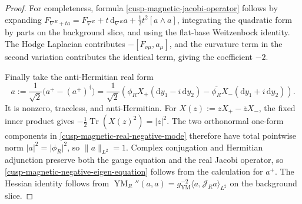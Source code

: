 \begin{proof}
For completeness, formula \eqref{cusp-magnetic-jacobi-operator} follows by
expanding
\(F_{\nabla^R+ta}=F_{\nabla^R}+t\,\mathrm d_{\nabla^R}a+
\tfrac12t^2[a\wedge a]\), integrating the quadratic form by parts on
the background slice, and using the flat-base Weitzenbock identity.  The
Hodge Laplacian contributes
\(-[F_{\nu\mu},a_\mu]\), and the curvature term in the second variation
contributes the identical term, giving the coefficient \(-2\).

Finally take the anti-Hermitian real form
\begin{equation}
 a:=\frac1{\sqrt2}\bigl(a^+-(a^+)^\dagger\bigr)
  =\frac1{\sqrt2}\left(
   \phi_RX_+(\mathrm dy_1-i\,\mathrm dy_2)
   -\overline{\phi_R}X_-(\mathrm dy_1+i\,\mathrm dy_2)\right).
 \label{cusp-magnetic-real-negative-mode}
\end{equation}
It is nonzero, traceless, and anti-Hermitian.  For
\(X(z):=zX_+-\overline zX_-\), the fixed inner product gives
\(-\tfrac12\operatorname{Tr}(X(z)^2)=\lvert z\rvert^2\).  The two
orthonormal one-form components in
\cref{cusp-magnetic-real-negative-mode} therefore have total pointwise
norm \(\lvert a\rvert^2=\lvert\phi_R\rvert^2\), so
\(\lVert a\rVert_{L^2}=1\).  Complex conjugation and
Hermitian adjunction preserve both the gauge equation and the real Jacobi
operator, so \eqref{cusp-magnetic-negative-eigen-equation} follows from
the calculation for \(a^+\).  The Hessian identity follows from
\(\operatorname{YM}_R''(a,a)
=g_{\mathrm{YM}}^{-2}\langle a,\mathcal J_Ra\rangle_{L^2}\)
on the background slice.
\end{proof}


